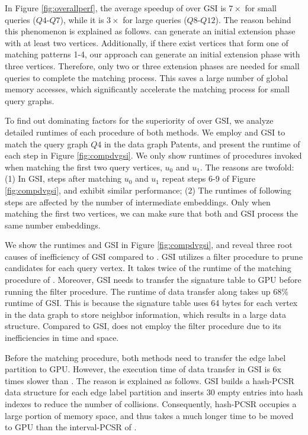In Figure \ref{fig:overallperf}, the average speedup of \SystemName over GSI is $7\times$ for small queries ($Q4$-$Q7$), while it is
$3\times$ for large queries ($Q8$-$Q12$). The reason behind this phenomenon is explained as follows. \SystemName can generate an initial
extension phase with at least two vertices. Additionally, if there exist vertices that form one of matching patterns 1-4, our approach can
generate an initial extension phase with three vertices. Therefore, only two or three extension phases are needed for small queries to
complete the matching process. This saves a large number of global memory accesses, which significantly accelerate the matching process for
small query graphs.

To find out dominating factors for the superiority of \SystemName over GSI, we analyze detailed runtimes of each procedure of both methods.
We employ \SystemName and GSI to match the query graph $Q4$ in the data graph Patents, and present the runtime of each step in Figure
\ref{fig:compdvgsi}. We only show runtimes of procedures invoked when matching the first two query vertices, $u_0$ and $u_1$. The reasons
are twofold: (1) In GSI, steps after matching $u_0$ and $u_1$ repeat steps 6-9 of Figure \ref{fig:compdvgsi}, and exhibit similar
performance; (2) The runtimes of following steps are affected by the number of intermediate embeddings. Only when matching the first two
vertices, we can make sure that both \SystemName and GSI process the same number embeddings.

We show the runtimes  \SystemName and GSI in Figure \ref{fig:compdvgsi}, and reveal three root causes of inefficiency of GSI compared to
\SystemName. GSI utilizes a filter procedure to prune candidates for each query vertex. It takes twice of the
      runtime of the matching procedure of \SystemName. Moreover, GSI needs to transfer the signature table to GPU before running the
      filter procedure. The runtime of data transfer along takes up 68\% runtime of GSI. This is because the signature table uses 64
      bytes for each vertex in the data graph to store neighbor information, which results in a large data structure. Compared to GSI,
      \SystemName does not employ the filter procedure due to its inefficiencies in time and space.


Before the matching procedure, both methods need to transfer the edge label partition to GPU. However, the execution time of data
      transfer in GSI is 6x times slower than \SystemName. The reason is explained as follows. GSI builds a hash-PCSR data structure for
      each edge label partition and inserts 30 empty entries into hash indexes to reduce the number of collisions. Consequently,
      hash-PCSR occupies a large portion of memory space, and thus takes a much longer time to be moved to GPU than the interval-PCSR of
      \SystemName.

